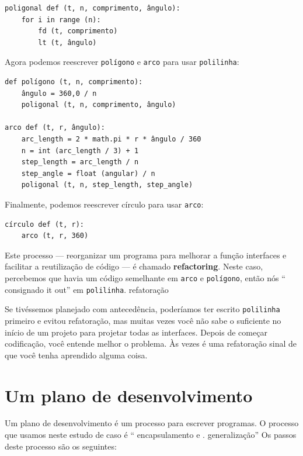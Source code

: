 \documentclass[10pt]{book}
\begin{document}
\begin{verbatim}
poligonal def (t, n, comprimento, ângulo):
    for i in range (n):
        fd (t, comprimento)
        lt (t, ângulo)
\end{verbatim}
%
Agora podemos reescrever {\tt polígono} e {\tt arco} para usar {\tt polilinha}:

\begin{verbatim}
def polígono (t, n, comprimento):
    ângulo = 360,0 / n
    poligonal (t, n, comprimento, ângulo)

arco def (t, r, ângulo):
    arc_length = 2 * math.pi * r * ângulo / 360
    n = int (arc_length / 3) + 1
    step_length = arc_length / n
    step_angle = float (angular) / n
    poligonal (t, n, step_length, step_angle)
\end{verbatim}
%
Finalmente, podemos reescrever {círculo \tt} para usar {\tt arco}:

\begin{verbatim}
círculo def (t, r):
    arco (t, r, 360)
\end{verbatim}
%
Este processo --- reorganizar um programa para melhorar a função
interfaces e facilitar a reutilização de código --- é chamado {\bf refactoring}.
Neste caso, percebemos que havia um código semelhante em {\tt arco} e
{\tt polígono}, então nós `` consignado it out'' em {\tt polilinha}.
\index{} refatoração

Se tivéssemos planejado com antecedência, poderíamos ter escrito {\tt polilinha} primeiro
e evitou refatoração, mas muitas vezes você não sabe o suficiente no
início de um projeto para projetar todas as interfaces. Depois de começar
codificação, você entende melhor o problema. Às vezes é uma refatoração
sinal de que você tenha aprendido alguma coisa.


\section{Um plano de desenvolvimento}

Um plano de desenvolvimento {\bf} é um processo para escrever programas.
O processo que usamos
neste estudo de caso é `` encapsulamento e
. generalização'' Os passos deste processo são os seguintes:
\end{document}
